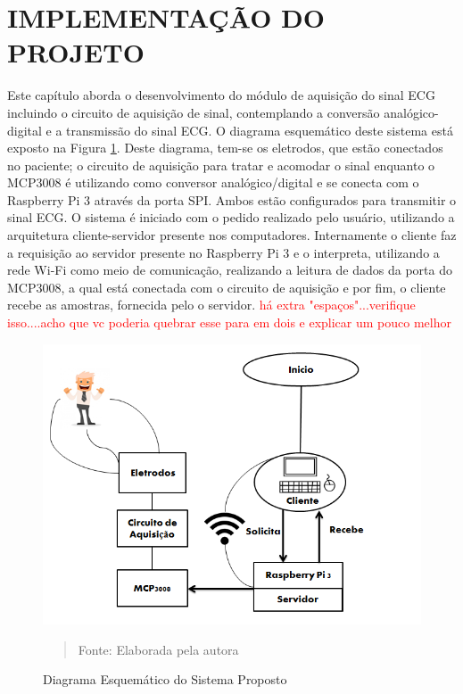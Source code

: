 \documentclass[12pt, a4paper]{article}
\begin{document}
\newpage


\section{IMPLEMENTAÇÃO DO PROJETO}

\hspace*{0.8cm} Este capítulo aborda o desenvolvimento do módulo de aquisição do sinal ECG incluindo o circuito de aquisição de sinal, contemplando a conversão analógico-digital e a transmissão do sinal ECG. O diagrama esquemático deste sistema está exposto na  Figura \ref{fig:dia}. Deste diagrama, tem-se os eletrodos, que estão conectados no paciente; o cir\-cuito de aquisição para tratar e acomodar o sinal enquanto o MCP3008 é utilizando como conversor analógico/digital e se conecta com o Raspberry Pi 3 através da porta SPI. Ambos estão configurados para transmitir o sinal ECG. O sistema é iniciado com o pedido realizado pelo usuário, utilizando a arquitetura cliente-servidor presente nos computadores. Internamente o cliente
faz a requisição ao servidor presente no Raspberry Pi 3 e o interpreta, utilizando a rede Wi-Fi como meio de comunicação, realizando a leitura de dados da porta do MCP3008, a qual está conectada com o circuito de aquisição e por fim, o cliente recebe as amostras, fornecida pelo o servidor. \textcolor{red}{há extra "espaços"...verifique isso....acho que vc poderia quebrar esse para em dois e explicar um pouco melhor}


\begin{figure}[H]
\begin{center}
			\caption{Diagrama Esquemático do Sistema Proposto}
			\includegraphics[width=.8\textwidth]{Figuras/diaG.PNG}
            \vspace*{\fill} 
            \begin{quote} 
            \centering 
           Fonte: {Elaborada pela autora}
            \end{quote}
            \vspace*{\fill}
			\label{fig:dia}

\end{center}
\end{figure}
\end{document}
